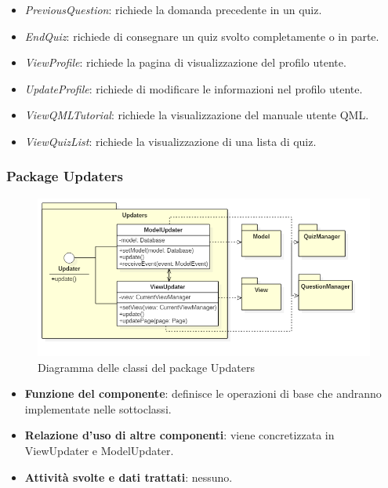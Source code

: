 \documentclass[a4paper,11pt]{article}
\begin{document}
\begin{itemize}
\begin{itemize}
				\item\textit{PreviousQuestion}: richiede la domanda precedente in un quiz.
				\item\textit{EndQuiz}: richiede di consegnare un quiz svolto completamente o in parte.
				\item\textit{ViewProfile}: richiede la pagina di visualizzazione del profilo utente.
				\item\textit{UpdateProfile}: richiede di modificare le informazioni nel profilo utente.
				\item\textit{ViewQMLTutorial}: richiede la visualizzazione del manuale utente QML.
				\item\textit{ViewQuizList}: richiede la visualizzazione di una lista di quiz.
				\end{itemize}
			\end{itemize}

			\subsubsection{Package Updaters}
			\begin{figure}[h!]
			\begin{center}
				\includegraphics[scale=0.65]{../images/UpdatersClass.png}
				\caption{Diagramma delle classi del package Updaters}
			\end{center}
			\end{figure}
			\begin{itemize}
				\item\textbf{Funzione del componente}: definisce le operazioni di base che andranno implementate nelle sottoclassi.
				\item\textbf{Relazione d'uso di altre componenti}: viene concretizzata in ViewUpdater e ModelUpdater.
				\item\textbf{Attività svolte e dati trattati}: nessuno.
			\end{itemize}
			
\end{document}
